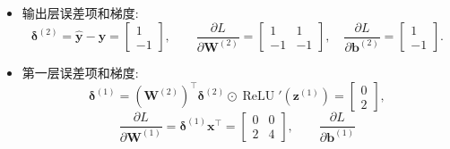 \documentclass{../nndlcourse}
\begin{document}
\begin{enumerate}
\begin{itemize}
\[\begin{bmatrix}
            1\\
            1
            \end{bmatrix},
        \]
        \[
            \hat{\boldsymbol{y}}
            =
            \boldsymbol{W}^{(2)}\boldsymbol{a}^{(1)}+\boldsymbol{b}^{(2)}
            =
            \begin{bmatrix}
            2\\
            0
            \end{bmatrix},
            \qquad
            L=1.
        \]
        因为两个隐藏单元的净输入都为正, 所以这里 ReLU 导数的两个分量都为 $1$.
        \item 输出层误差项和梯度:
        \[
            \boldsymbol{\delta}^{(2)}
            =
            \hat{\boldsymbol{y}}-\boldsymbol{y}
            =
            \begin{bmatrix}
            1\\
            -1
            \end{bmatrix},
            \qquad
            \frac{\partial L}{\partial \boldsymbol{W}^{(2)}}
            =
            \begin{bmatrix}
            1 & 1\\
            -1 & -1
            \end{bmatrix},
            \quad
            \frac{\partial L}{\partial \boldsymbol{b}^{(2)}}
            =
            \begin{bmatrix}
            1\\
            -1
            \end{bmatrix}.
        \]
        \item 第一层误差项和梯度:
        \[
            \boldsymbol{\delta}^{(1)}
            =
            {\left(\boldsymbol{W}^{(2)}\right)}^\top
            \boldsymbol{\delta}^{(2)}
            \odot
            \operatorname{ReLU}'(\boldsymbol{z}^{(1)})
            =
            \begin{bmatrix}
            0\\
            2
            \end{bmatrix},
        \]
        \[
            \frac{\partial L}{\partial \boldsymbol{W}^{(1)}}
            =
            \boldsymbol{\delta}^{(1)}\boldsymbol{x}^{\top}
            =
            \begin{bmatrix}
            0 & 0\\
            2 & 4
            \end{bmatrix},
            \qquad
            \frac{\partial L}{\partial \boldsymbol{b}^{(1)}}
\]
\end{itemize}
\end{enumerate}
\end{document}
